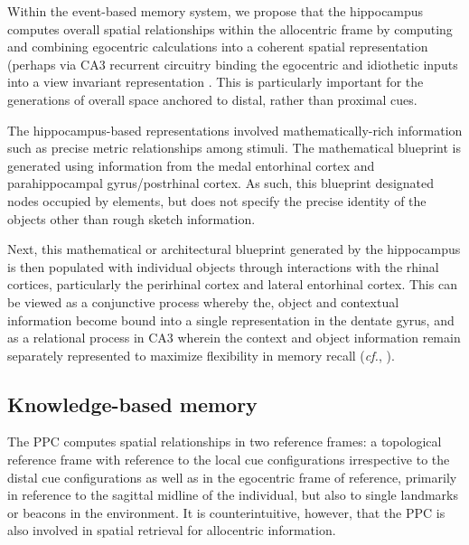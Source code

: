\documentclass[doc, longtable]{apa6}
\begin{document}
Within the event-based memory system, we propose that the hippocampus computes overall spatial relationships within the allocentric frame by computing and combining egocentric calculations into a coherent spatial representation (perhaps via CA3 recurrent circuitry binding the egocentric and idiothetic inputs into a view invariant representation \parencite{hunsaker2013operation, Rolls2006b}. This is particularly important for the generations of overall space anchored to distal, rather than proximal cues.
	
The hippocampus-based representations involved mathematically-rich information such as precise metric relationships among stimuli. The mathematical blueprint is generated using information from the medal entorhinal cortex and parahippocampal gyrus/postrhinal cortex. As such, this blueprint designated nodes occupied by elements, but does not specify the precise identity of the objects other than rough sketch information.
	
Next, this mathematical or architectural blueprint generated by the hippocampus is then populated with individual objects through interactions with the rhinal cortices, particularly the perirhinal cortex and lateral entorhinal cortex. This can be viewed as a conjunctive process whereby the, object and contextual information become bound into a single representation in the dentate gyrus, and as a relational process in CA3 wherein the context and object information remain separately represented to maximize flexibility in memory recall (\textit{cf.}, \cite{Hunsaker2013c, Hunsaker2007c}).

\subsection{Knowledge-based memory}
The PPC computes spatial relationships in two reference frames: a topological reference frame with reference to the local cue configurations irrespective to the distal cue configurations as well as in the egocentric frame of reference, primarily in reference to the sagittal midline of the individual, but also to single landmarks or beacons in the environment. It is counterintuitive, however, that the PPC is also involved in spatial retrieval for allocentric information.
	
\end{document}
